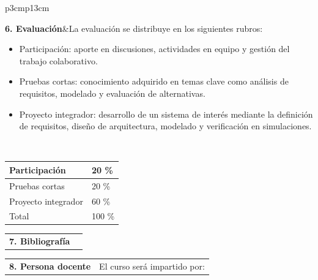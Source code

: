 \documentclass[letterpaper]{article}%
\begin{document}
\begin{tabularx}{\textwidth}{p{3cm}p{13cm}}%
\par\fontsize{12}{14}\selectfont \textbf{\textcolor{parte}{6. Evaluación}}&La evaluación se distribuye en los siguientes rubros:\vspace*{1mm} \newline  \begin{itemize} \item Participación: aporte en discusiones, actividades en equipo y gestión del trabajo colaborativo. \item Pruebas cortas: conocimiento adquirido en temas clave como análisis de requisitos, modelado y evaluación de alternativas. \item Proyecto integrador: desarrollo de un sistema de interés mediante la definición de requisitos, diseño de arquitectura, modelado y verificación en simulaciones. \end{itemize}\\%
\end{tabularx}%
\vspace*{2mm}%
\newline%
 \begin{minipage}{\linewidth}  \centering  \begin{tabular}{ p{4cm}  p{1.5cm} }  \toprule  Participación & 20 \% \\  \midrule  Pruebas cortas & 20 \% \\  \midrule  Proyecto integrador & 60 \% \\  \midrule Total & 100 \% \\  \bottomrule  \end{tabular} \end{minipage}%
\vspace*{4mm}%
\newline%
\begin{tabularx}{\textwidth}{p{3cm}p{13cm}}%
\par\fontsize{12}{14}\selectfont \textbf{\textcolor{parte}{7. Bibliografía}}&\nocite{incose2023} \\%
\end{tabularx}%
\vspace*{-8mm}\printbibliography[heading=none]%
\begin{tabularx}{\textwidth}{p{3cm}p{13cm}}%
\par\fontsize{12}{14}\selectfont \textbf{\textcolor{parte}{8. Persona docente}}&El curso será impartido por:\\%
\end{tabularx}%
\end{document}
